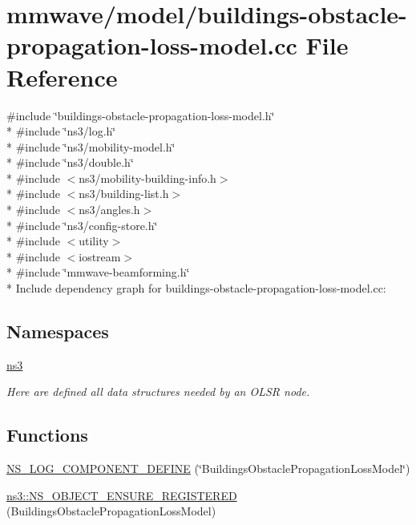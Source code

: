 \hypertarget{buildings-obstacle-propagation-loss-model_8cc}{}\section{mmwave/model/buildings-\/obstacle-\/propagation-\/loss-\/model.cc File Reference}
\label{buildings-obstacle-propagation-loss-model_8cc}
{\ttfamily \#include \char`\"{}buildings-\/obstacle-\/propagation-\/loss-\/model.\+h\char`\"{}}\\*
{\ttfamily \#include \char`\"{}ns3/log.\+h\char`\"{}}\\*
{\ttfamily \#include \char`\"{}ns3/mobility-\/model.\+h\char`\"{}}\\*
{\ttfamily \#include \char`\"{}ns3/double.\+h\char`\"{}}\\*
{\ttfamily \#include $<$ns3/mobility-\/building-\/info.\+h$>$}\\*
{\ttfamily \#include $<$ns3/building-\/list.\+h$>$}\\*
{\ttfamily \#include $<$ns3/angles.\+h$>$}\\*
{\ttfamily \#include \char`\"{}ns3/config-\/store.\+h\char`\"{}}\\*
{\ttfamily \#include $<$utility$>$}\\*
{\ttfamily \#include $<$iostream$>$}\\*
{\ttfamily \#include \char`\"{}mmwave-\/beamforming.\+h\char`\"{}}\\*
Include dependency graph for buildings-\/obstacle-\/propagation-\/loss-\/model.cc\+:
\subsection*{Namespaces}
\begin{DoxyCompactItemize}
\item 
 \hyperlink{namespacens3}{ns3}
\begin{DoxyCompactList}\small\item\em Here are defined all data structures needed by an O\+L\+SR node. \end{DoxyCompactList}\end{DoxyCompactItemize}
\subsection*{Functions}
\begin{DoxyCompactItemize}
\item 
\hyperlink{buildings-obstacle-propagation-loss-model_8cc_a0bb212a3b7e6ff9f603e7024f1ea793d}{N\+S\+\_\+\+L\+O\+G\+\_\+\+C\+O\+M\+P\+O\+N\+E\+N\+T\+\_\+\+D\+E\+F\+I\+NE} (\char`\"{}Buildings\+Obstacle\+Propagation\+Loss\+Model\char`\"{})
\item 
\hyperlink{namespacens3_ae7bcc6799258ebda64765ce7b5a01fe3}{ns3\+::\+N\+S\+\_\+\+O\+B\+J\+E\+C\+T\+\_\+\+E\+N\+S\+U\+R\+E\+\_\+\+R\+E\+G\+I\+S\+T\+E\+R\+ED} (Buildings\+Obstacle\+Propagation\+Loss\+Model)
\end{DoxyCompactItemize}
